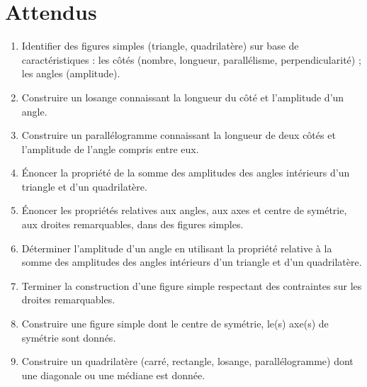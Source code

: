 \documentclass[../../syllabus_1.tex]{subfiles}
\begin{document}
\section*{Attendus}
\begin{enumerate}[label=\textbf{\arabic*.}]
    \item Identifier des figures simples (triangle, quadrilatère) sur base de caractéristiques : les côtés (nombre, longueur, parallélisme, perpendicularité) ; les angles (amplitude).
    \item Construire un losange connaissant la longueur du côté et l'amplitude d'un angle.
    \item Construire un parallélogramme connaissant la longueur de deux côtés et l'amplitude de l'angle compris entre eux.
    \item Énoncer la propriété de la somme des amplitudes des angles intérieurs d'un triangle et d'un quadrilatère.
    \item Énoncer les propriétés relatives aux angles, aux axes et centre de symétrie, aux droites remarquables, dans des figures simples.
    \item Déterminer l'amplitude d'un angle en utilisant la propriété relative à la somme des amplitudes des angles intérieurs d'un triangle et d'un quadrilatère.
    \item Terminer la construction d'une figure simple respectant des contraintes sur les droites remarquables.
    \item Construire une figure simple dont le centre de symétrie, le(s) axe(s) de symétrie sont donnés.
    \item Construire un quadrilatère (carré, rectangle, losange, parallélogramme) dont une diagonale ou une médiane est donnée.
\end{enumerate}
\end{document}
